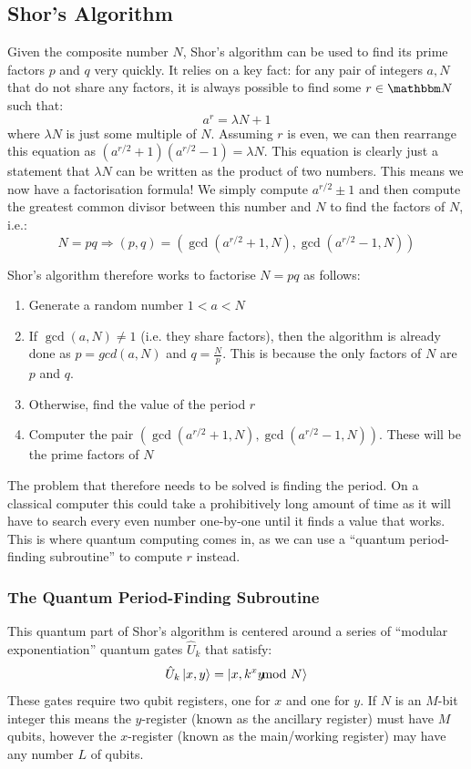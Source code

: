 \documentclass{article}[11pt]
\begin{document}
\subsection{Shor's Algorithm}\label{section:shor}
Given the composite number $N$, Shor’s algorithm can be used to find its prime factors $p$ and $q$ very quickly. It relies on a key fact: for any pair of integers $a, N$ that do not share any factors, it is always possible to find some $r\in\mathbbm N$ such that:\cite{nielsenChuang,Shors_algorithm}
\begin{equation}
a^r=\lambda N+1
\end{equation}
where $\lambda N$ is just some multiple of $N$. Assuming $r$ is even, we can then rearrange this equation as $(a^{r/2}+1)(a^{r/2}-1)=\lambda N$. This equation is clearly just a statement that $\lambda N$ can be written as the product of two numbers. This means we now have a factorisation formula! We simply compute $a^{r/2}\pm 1$ and then compute the greatest common divisor between this number and $N$ to find the factors of $N$, i.e.:\cite{candela,shorcircuit}
\begin{equation}
N=pq \Rightarrow (p,q)=\left(\gcd(a^{r/2}+1,N),\gcd(a^{r/2}-1,N)\right)
\end{equation}

Shor's algorithm therefore works to factorise $N=pq$ as follows:
\begin{enumerate}
    \item Generate a random number $1<a<N$
    \item If $\gcd (a,N)\neq 1$ (i.e. they share factors), then the algorithm is already done as $p=gcd(a, N)$ and $q=\frac{N}{p}$. This is because the only factors of $N$ are $p$ and $q$.
    \item Otherwise, find the value of the period $r$
    \item Computer the pair $\left(\gcd(a^{r/2}+1,N),\gcd(a^{r/2}-1,N)\right)$. These will be the prime factors of $N$
\end{enumerate}

The problem that therefore needs to be solved is finding the period. On a classical computer this could take a prohibitively long amount of time as it will have to search every even number one-by-one until it finds a value that works. This is where quantum computing comes in, as we can use a ``quantum period-finding subroutine'' to compute $r$ instead.

\subsubsection{The Quantum Period-Finding Subroutine}
This quantum part of Shor's algorithm is centered around a series of ``modular exponentiation'' quantum gates $\hat U_k$ that satisfy:\cite{shorcircuit}
\begin{equation}
\hat U_k\ket{x,y}=\ket{x,k^xy\hspace{-0.3cm}\mod N}
\end{equation}
These gates require two qubit registers, one for $x$ and one for $y$. If $N$ is an $M$-bit integer this means the $y$-register (known as the ancillary register) must have $M$ qubits, however the $x$-register (known as the main/working register) may have any number $L$ of qubits.
\end{document}
